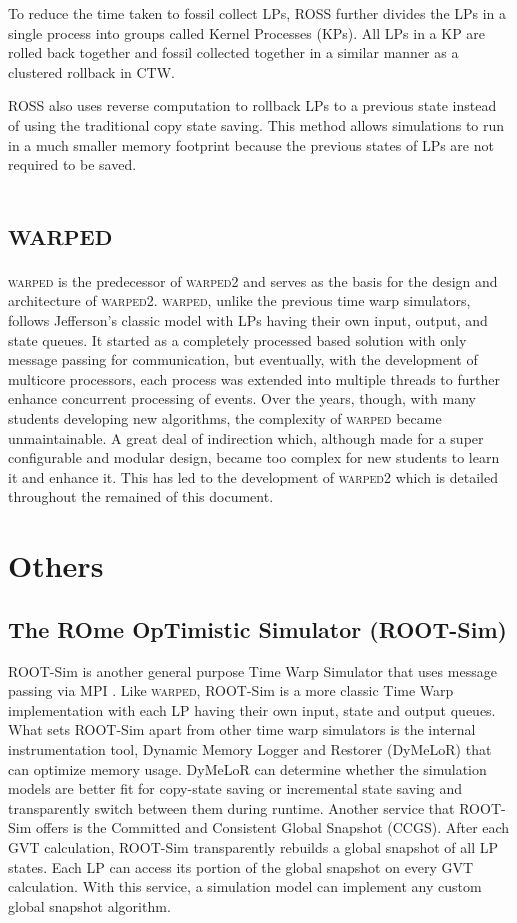 \documentclass[11pt]{book}
\begin{document}
To reduce the time taken to fossil collect LPs, ROSS further divides the LPs in a single process
into groups called Kernel Processes (KPs). All LPs in a KP are rolled back together and fossil
collected together in a similar manner as a clustered rollback in CTW.

ROSS also uses reverse computation\cite{carothers-99} to rollback LPs to a previous state instead
of using the traditional copy state saving. This method allows simulations to run in a much smaller
memory footprint because the previous states of LPs are not required to be saved.

\section{\textsc{warped}}

\textsc{warped} is the predecessor of \textsc{warped2} and serves as the basis for the design
and architecture of \textsc{warped2}. \textsc{warped}, unlike the previous time warp simulators,
follows Jefferson's classic model with LPs having their own input, output, and state queues. It
started as a completely processed based solution with only message passing for communication,
but eventually, with the development of multicore processors, each process was extended into
multiple threads to further enhance concurrent processing of events. Over the years, though, with
many students developing new algorithms, the complexity of \textsc{warped} became unmaintainable.
A great deal of indirection which, although made for a super configurable and modular
design, became too complex for new students to learn it and enhance it. This has led to the
development of \textsc{warped2} which is detailed throughout the remained of this document.

\section{Others}

\subsection{The ROme OpTimistic Simulator (ROOT-Sim)}

ROOT-Sim is another general purpose Time Warp Simulator that uses message passing via MPI
\cite{pellegrini-11}. Like \textsc{warped}, ROOT-Sim is a more classic Time Warp
implementation with each LP having their own input, state and output queues. What sets
ROOT-Sim apart from other time warp simulators is the internal instrumentation tool, Dynamic
Memory Logger and Restorer (DyMeLoR) that can optimize memory usage. DyMeLoR can determine
whether the simulation models are better fit for copy-state saving or incremental state
saving and transparently switch between them during runtime. Another service that ROOT-Sim
offers is the Committed and Consistent Global Snapshot (CCGS). After each GVT calculation,
ROOT-Sim transparently rebuilds a global snapshot of all LP states. Each LP can access its
portion of the global snapshot on every GVT calculation. With this service, a simulation
model can implement any custom global snapshot algorithm.
\end{document}
